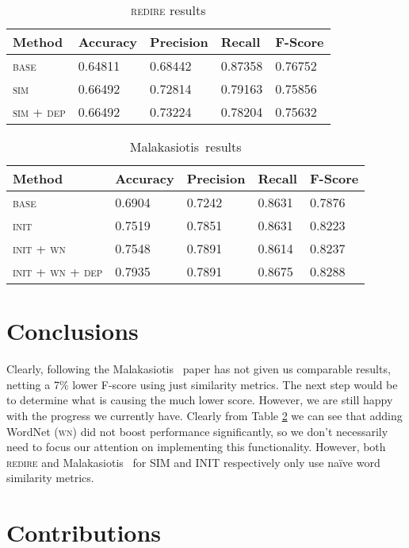 \documentclass[11pt, reqno]{amsart}
\newcommand{\mala}{Malakasiotis}
\begin{document}
	\begin{table}[H]
	\centering	
	\begin{tabular}{|l||l||l|l|l|}
	\hline
	\textbf{Method} & \textbf{Accuracy} & \textbf{Precision} & \textbf{Recall} & \textbf{F-Score} \\ \hline
	\textsc{base} & 0.64811 & 0.68442 & 0.87358 & 0.76752 \\ \hline
	\textsc{sim} & 0.66492 & 0.72814 & 0.79163 & 0.75856 \\ \hline
	\textsc{sim} + \textsc{dep} & 0.66492 & 0.73224 & 0.78204 & 0.75632 \\ \hline
	\end{tabular}
	\caption{\textsc{redire} results}\label{tab:result}
	\end{table}
	
	\begin{table}[H]
	\centering
	\begin{tabular}{|l||l||l|l|l|}
	\hline
	\textbf{Method} & \textbf{Accuracy} & \textbf{Precision} & \textbf{Recall} & \textbf{F-Score} \\ \hline
	\textsc{base} & 0.6904 & 0.7242 & 0.8631 & 0.7876 \\ \hline
	\textsc{init} & 0.7519 & 0.7851 & 0.8631 & 0.8223 \\ \hline
	\textsc{init} + \textsc{wn} & 0.7548 & 0.7891 & 0.8614 & 0.8237 \\ \hline
	\textsc{init} + \textsc{wn} + \textsc{dep} & 0.7935 & 0.7891 & 0.8675 & 0.8288 \\ \hline
	\end{tabular}
	\caption{\mala~results}\label{tab:malak}
	\end{table}

	\section{Conclusions}
	
	Clearly, following the \mala~ paper has not given us comparable results, netting a 7\% lower F-score using just similarity metrics. The next step would be to determine what is causing the much lower score. However, we are still happy with the progress we currently have. Clearly from Table \ref{tab:malak} we can see that adding WordNet (\textsc{wn}) did not boost performance significantly, so we don't necessarily need to focus our attention on implementing this functionality. However, both \textsc{redire} and \mala~ for \textsc{SIM} and \textsc{INIT} respectively only use na\"ive word similarity metrics. 
	
	\section{Contributions}
	
	
	
		
\end{document}
